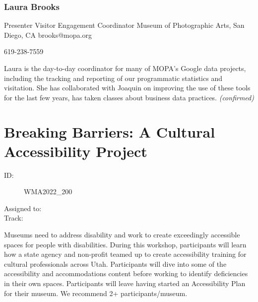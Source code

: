 \documentclass{report}
\begin{document}
              

              
                \subsubsection*{ Laura Brooks }
                Presenter\newline
                Visitor Engagement Coordinator\newline
                Museum of Photographic Arts, San Diego, CA
                \newline
                brooks@mopa.org\newline
                
                619-238-7559\newline

                Laura is the day-to-day coordinator for many of MOPA's Google data projects, including the tracking and reporting of our programmatic statistics and visitation. She has collaborated with Joaquin on improving the use of these tools for the last few years, has taken classes about business data practices.
                \emph{ (confirmed) }
              

              

              

              
        
          \newpage
          \section{ Breaking Barriers: A Cultural Accessibility Project }
            \begin{description}
              \item [ID:]
              WMA2022\_200

              \item [Assigned to:]
                \item [Track:]
              \end{description}

              Museums need to address disability and work to create exceedingly accessible spaces for people with disabilities. During this workshop, participants will learn how a state agency and non-profit teamed up to create accessibility training for cultural professionals across Utah. Participants will dive into some of the accessibility and accommodations content before working to identify deficiencies in their own spaces. Participants will leave having started an Accessibility Plan for their museum. We recommend 2+ participants/museum.
\end{document}
